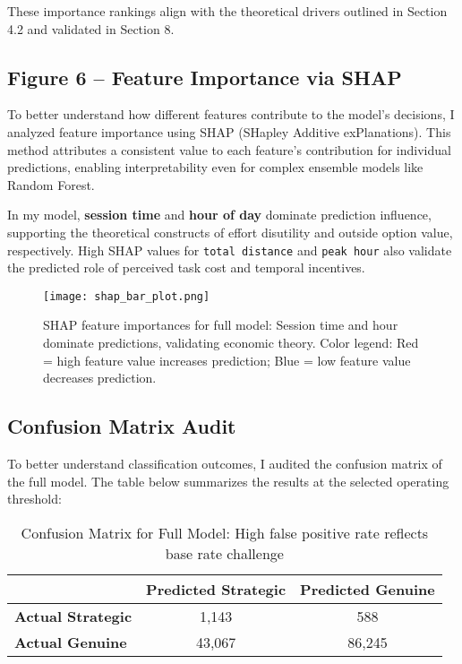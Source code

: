 \documentclass[12pt,letterpaper]{article}
\begin{document}
These importance rankings align with the theoretical drivers outlined in Section 4.2 and validated in Section 8.

\subsection*{Figure 6 -- Feature Importance via SHAP}

To better understand how different features contribute to the model's decisions, I analyzed feature importance using SHAP (SHapley Additive exPlanations). This method attributes a consistent value to each feature's contribution for individual predictions, enabling interpretability even for complex ensemble models like Random Forest.

In my model, \textbf{session time} and \textbf{hour of day} dominate prediction influence, supporting the theoretical constructs of effort disutility and outside option value, respectively. High SHAP values for \texttt{total distance} and \texttt{peak hour} also validate the predicted role of perceived task cost and temporal incentives.

\begin{figure}[H]
\centering
\texttt{[image: shap\_bar\_plot.png]}
\caption{SHAP feature importances for full model: Session time and hour dominate predictions, validating economic theory. Color legend: Red = high feature value increases prediction; Blue = low feature value decreases prediction.}
\label{fig:shap_bar}
\end{figure}

\subsection{Confusion Matrix Audit}

To better understand classification outcomes, I audited the confusion matrix of the full model. The table below summarizes the results at the selected operating threshold:

\begin{table}[H]
\centering
\caption{Confusion Matrix for Full Model: High false positive rate reflects base rate challenge}
\label{tab:confusion_matrix}
\begin{tabular}{lcc}
\toprule
 & Predicted Strategic & Predicted Genuine \\
\midrule
\textbf{Actual Strategic} & 1,143 & 588 \\
\textbf{Actual Genuine}   & 43,067 & 86,245 \\
\bottomrule
\end{tabular}
\end{table}
\end{document}
